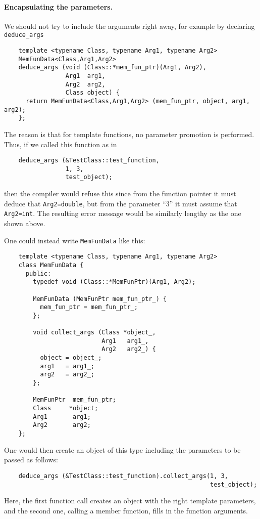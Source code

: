 \documentclass[11pt]{article}
\begin{document}
\paragraph{Encapsulating the parameters.}
We should
not try to include the arguments right away, for example by declaring
\texttt{deduce\_args}
\begin{verbatim}
    template <typename Class, typename Arg1, typename Arg2>
    MemFunData<Class,Arg1,Arg2>
    deduce_args (void (Class::*mem_fun_ptr)(Arg1, Arg2),
                 Arg1  arg1,
                 Arg2  arg2,
                 Class object) {
      return MemFunData<Class,Arg1,Arg2> (mem_fun_ptr, object, arg1, arg2);
    };
\end{verbatim}
The reason is that for template functions, no parameter promotion is
performed. Thus, if we called this function as in
\begin{verbatim}
    deduce_args (&TestClass::test_function,
                 1, 3,
                 test_object);
\end{verbatim}
then the compiler would refuse this since from the function pointer it must
deduce that \texttt{Arg2=double}, but from the parameter ``3'' it must assume
that \texttt{Arg2=int}. The resulting error message would be similarly lengthy
as the one shown above.

One could instead write \texttt{MemFunData} like this:
\begin{verbatim}
    template <typename Class, typename Arg1, typename Arg2>
    class MemFunData { 
      public:
        typedef void (Class::*MemFunPtr)(Arg1, Arg2);

        MemFunData (MemFunPtr mem_fun_ptr_) {
          mem_fun_ptr = mem_fun_ptr_;
        };

        void collect_args (Class *object_,
                           Arg1   arg1_,
                           Arg2   arg2_) {
          object = object_;
          arg1   = arg1_;
          arg2   = arg2_;
        };

        MemFunPtr  mem_fun_ptr;
        Class     *object;
        Arg1       arg1;
        Arg2       arg2;
    };
\end{verbatim}
One would then create an object of this type including the parameters to be
passed as follows:
\begin{verbatim}
    deduce_args (&TestClass::test_function).collect_args(1, 3,
                                                         test_object);
\end{verbatim}
Here, the first function call creates an object with the right template
parameters, and the second one, calling a member function, fills in the
function arguments. 
\end{document}
